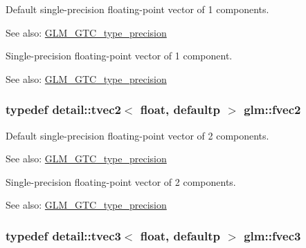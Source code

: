 Default single-precision floating-point vector of 1 components. \begin{Desc}
\item[See also:]\hyperlink{group__gtc__type__precision}{GLM\_\-GTC\_\-type\_\-precision}\end{Desc}
Single-precision floating-point vector of 1 component. \begin{Desc}
\item[See also:]\hyperlink{group__gtc__type__precision}{GLM\_\-GTC\_\-type\_\-precision} \end{Desc}
\hypertarget{group__gtc__type__precision_gafd518792a4646c7bb60aabc62a4684c}{
\subsubsection[fvec2]{\setlength{\rightskip}{0pt plus 5cm}typedef detail::tvec2$<$ float, defaultp $>$ {\bf glm::fvec2}}}
\label{group__gtc__type__precision_gafd518792a4646c7bb60aabc62a4684c}


Default single-precision floating-point vector of 2 components. \begin{Desc}
\item[See also:]\hyperlink{group__gtc__type__precision}{GLM\_\-GTC\_\-type\_\-precision}\end{Desc}
Single-precision floating-point vector of 2 components. \begin{Desc}
\item[See also:]\hyperlink{group__gtc__type__precision}{GLM\_\-GTC\_\-type\_\-precision} \end{Desc}
\hypertarget{group__gtc__type__precision_g33b85a14a8f68ec99029ff13db6af369}{
\subsubsection[fvec3]{\setlength{\rightskip}{0pt plus 5cm}typedef detail::tvec3$<$ float, defaultp $>$ {\bf glm::fvec3}}}
\label{group__gtc__type__precision_g33b85a14a8f68ec99029ff13db6af369}



